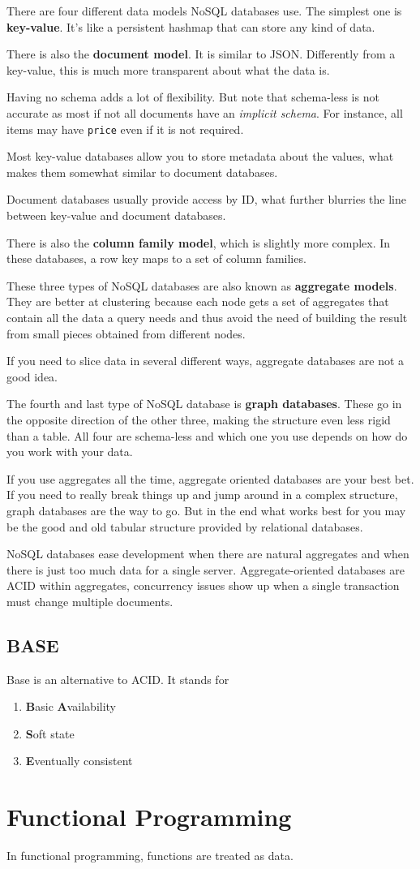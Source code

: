 \documentclass[oneside]{book} %
\theoremstyle{plain}
\begin{document}
There are four different data models NoSQL databases use.
The simplest one is \textbf{key-value}. It's like a persistent hashmap that can
store any kind of data.

There is also the \textbf{document model}. It is similar to JSON. Differently
from a key-value, this is much more transparent about what the data is.

Having no schema adds a lot of flexibility. But note that schema-less is not
accurate as most if not all documents have an \textit{implicit schema}. For
instance, all items may have \texttt{price} even if it is not required.

Most key-value databases allow you to store metadata about the values, what
makes them somewhat similar to document databases.

Document databases usually provide access by ID, what further blurries the line
between key-value and document databases.

There is also the \textbf{column family model}, which is slightly more complex.
In these databases, a row key maps to a set of column families.

These three types of NoSQL databases are also known as \textbf{aggregate
models}. They are better at clustering because each node gets a set of
aggregates that contain all the data a query needs and thus avoid the need of
building the result from small pieces obtained from different nodes.

If you need to slice data in several different ways, aggregate databases are not
a good idea.

The fourth and last type of NoSQL database is \textbf{graph databases}. These go
in the opposite direction of the other three, making the structure even less
rigid than a table. All four are schema-less and which one you use depends on
how do you work with your data.

If you use aggregates all the time, aggregate oriented databases are your best
bet. If you need to really break things up and jump around in a complex
structure, graph databases are the way to go. But in the end what works best for
you may be the good and old tabular structure provided by relational databases.

NoSQL databases ease development when there are natural aggregates and when
there is just too much data for a single server.
Aggregate-oriented databases are ACID within aggregates, concurrency issues show
up when a single transaction must change multiple documents.

\section{BASE}
Base is an alternative to ACID.
It stands for

\begin{enumerate}
  \item \textbf{B}asic \textbf{A}vailability
  \item \textbf{S}oft state
  \item \textbf{E}ventually consistent
\end{enumerate}

\chapter{Functional Programming}
In functional programming, functions are treated as data.
\end{document}
